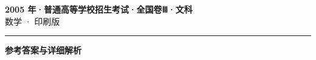 \documentclass[zihao=5, a4paper]{ctexart}
\begin{document}
\begin{center}
  {\Large\bfseries 2005 年·普通高等学校招生考试·全国卷Ⅲ·文科}\\[4pt]
  {\large 数学 · 印刷版}
\end{center}
\medskip
{}

\par\bigskip\hrule\bigskip
{}
\begin{center}{\large\bfseries 参考答案与详细解析}\end{center}
\smallskip

\end{document}

